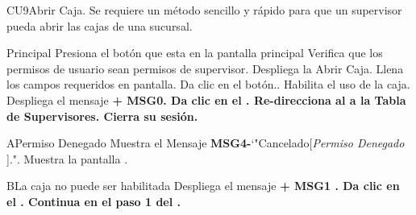 \begin{UseCase}{CU9}{Abrir Caja.}{
		Se requiere un método sencillo y rápido para que un supervisor pueda abrir las cajas de una sucursal.
	}
	\end{UseCase}
	\begin{UCtrayectoria}{Principal}
		\UCpaso [\UCactor] Presiona el botón  que esta en la pantalla principal 
		\UCpaso Verifica que los permisos de usuario sean permisos de supervisor. 
		\UCpaso Despliega la  {Abrir Caja}.
		\UCpaso [\UCactor] Llena los campos requeridos en pantalla. 
		\UCpaso [\UCactor] Da clic en el botón..
		\UCpaso Habilita el uso de la caja.
		\UCpaso Despliega el mensaje \bf {+ MSG0}. 
		\UCpaso[\UCactor] Da clic en el .
		\UCpaso Re-direcciona al \UCactor a la  {Tabla de Supervisores}.
		\UCpaso[\UCactor] Cierra su sesión.
	\end{UCtrayectoria}
	\begin{UCtrayectoriaA}{A}{Permiso Denegado}
			\UCpaso Muestra el Mensaje {\bf MSG4-}`"Cancelado[{\em Permiso Denegado }].".
			\UCpaso Muestra la pantalla .
		\end{UCtrayectoriaA}

		\begin{UCtrayectoriaA}{B}{La caja no puede ser habilitada}
			\UCpaso Despliega el mensaje \bf {+ MSG1 }.
			\UCpaso[\UCactor] Da clic en el .
			\UCpaso Continua en el paso 1 del .
		\end{UCtrayectoriaA}

